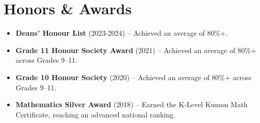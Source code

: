 \documentclass[12pt,letterpaper]{article}
\begin{document}
	\section{Honors \& Awards}
	\begin{itemize}
		\item \textbf{Deans' Honour List} (2023-2024) -- Achieved an average of 80\%+.
		\item \textbf{Grade 11 Honour Society Award} (2021) -- Achieved an average of 80\%+ across Grades 9–11.
		\item \textbf{Grade 10 Honour Society} (2020) -- Achieved an average of 80\%+ across Grades 9–11.
		\item \textbf{Mathematics Silver Award} (2018) -- Earned the K-Level Kumon Math Certificate, reaching an advanced national ranking.
	\end{itemize}
\end{document}
